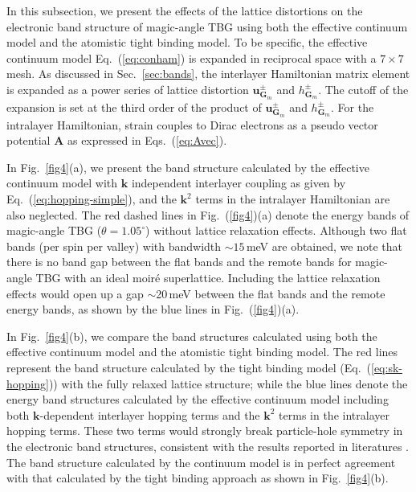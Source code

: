 \documentclass[aps,prx,10pt,twocolumn,superscriptaddress]{revtex4}
\def\Blue#1{\textcolor{blue}{#1}}
\begin{document}
In this subsection, we present the effects of the lattice distortions on the electronic band structure of magic-angle TBG using both the effective continuum model and the atomistic tight binding model. To be specific, the effective continuum model Eq.~(\ref{eq:conham}) is expanded in reciprocal space with a $7\times7$ mesh. As discussed in Sec.~\ref{sec:bands}, the  interlayer Hamiltonian matrix element is expanded as a power series of lattice distortion $\textbf{u}^{\pm}_{\textbf{G}_{m}}$ and $h^{\pm}_{\textbf{G}_{m}}$. %
The cutoff of the expansion is set at the third order of the product of $\textbf{u}^{\pm}_{\textbf{G}_{m}}$ and $h^{\pm}_{\textbf{G}_{m}}$. For the intralayer Hamiltonian, strain couples to Dirac electrons as a pseudo vector potential $\mathbf{A}$ as expressed in Eqs.~(\ref{eq:Avec}). 


In Fig.~\ref{fig4}(a), we present the band structure calculated by the effective continuum model with $\mathbf{k}$ independent interlayer coupling as given by Eq.~(\ref{eq:hopping-simple}), and the $\textbf{k}^{2}$ terms in the intralayer Hamiltonian are also neglected. %
The red dashed lines in Fig.~(\ref{fig4})(a) denote the energy bands of magic-angle TBG ($\theta=1.05^{\circ}$) without lattice relaxation effects. Although two flat bands (per spin per valley) with bandwidth $\sim 15\,$meV are obtained, we note that there is no band gap between the flat bands and the remote bands for magic-angle TBG with an ideal moir\'e superlattice. Including the lattice relaxation effects would open up a gap $\sim$20\,meV between the flat bands and the remote energy bands, as shown by the blue lines in Fig.~(\ref{fig4})(a).


In Fig.~\ref{fig4}(b), we compare the band structures calculated using both the effective continuum model and the atomistic tight binding model. The red lines represent the band structure calculated by the tight binding model (Eq.~(\ref{eq:sk-hopping})) with the fully relaxed lattice structure; while the blue lines denote the energy band structures calculated by the effective continuum model including both $\textbf{k}$-dependent interlayer hopping terms and the $\textbf{k}^{2}$ terms in the intralayer hopping terms. These two terms would strongly break particle-hole symmetry in the electronic band structures, consistent with the results reported in literatures \cite{koshino-ep-prb20,fang-tbg-arxiv19,SongZhida-tbg2-prb21,kv-prb23}. The band structure calculated by the continuum model is in perfect agreement with that calculated by the tight binding approach as shown in Fig.~\ref{fig4}(b).
\end{document}
